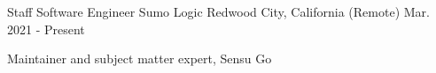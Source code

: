 

\begin{cventries}

  \cventry
    {Staff Software Engineer} %
    {Sumo Logic} %
	{Redwood City, California (Remote)} %
    {Mar. 2021 - Present} %
    {
      \begin{cvitems} %
        \item {Maintainer and subject matter expert, Sensu Go}
      \end{cvitems}
    }

\end{cventries}
